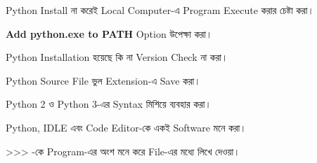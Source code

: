 

\begin{compacttwocolpoints}

\item Python Install না করেই Local Computer-এ Program
Execute করার চেষ্টা করা।

\item
\textbf{Add python.exe to PATH}
Option উপেক্ষা করা।

\item Python Installation হয়েছে কি না Version Check না করা।

\item Python Source File ভুল Extension-এ Save করা।

\item Python 2 ও Python 3-এর Syntax মিশিয়ে ব্যবহার করা।

\item Python, IDLE এবং Code Editor-কে একই Software মনে করা।

\item
\textenglish{\ttfamily >>>}
-কে Program-এর অংশ মনে করে File-এর মধ্যে লিখে দেওয়া।

\end{compacttwocolpoints}


